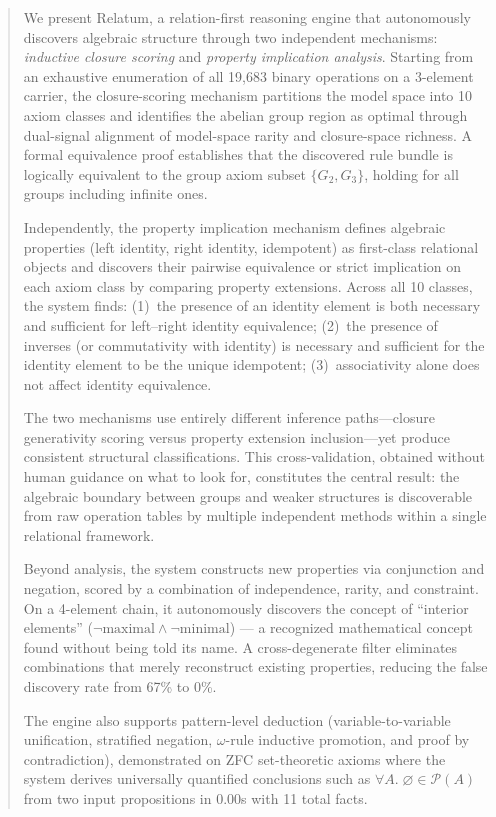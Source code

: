 \begin{abstract}

We present Relatum, a relation-first reasoning engine that autonomously discovers algebraic structure through two independent mechanisms: \emph{inductive closure scoring} and \emph{property implication analysis}. Starting from an exhaustive enumeration of all 19{,}683 binary operations on a 3-element carrier, the closure-scoring mechanism partitions the model space into 10 axiom classes and identifies the abelian group region as optimal through dual-signal alignment of model-space rarity and closure-space richness. A formal equivalence proof establishes that the discovered rule bundle is logically equivalent to the group axiom subset $\{G_2, G_3\}$, holding for all groups including infinite ones.

Independently, the property implication mechanism defines algebraic properties (left identity, right identity, idempotent) as first-class relational objects and discovers their pairwise equivalence or strict implication on each axiom class by comparing property extensions. Across all 10 classes, the system finds: (1)~the presence of an identity element is both necessary and sufficient for left--right identity equivalence; (2)~the presence of inverses (or commutativity with identity) is necessary and sufficient for the identity element to be the unique idempotent; (3)~associativity alone does not affect identity equivalence.

The two mechanisms use entirely different inference paths---closure generativity scoring versus property extension inclusion---yet produce consistent structural classifications. This cross-validation, obtained without human guidance on what to look for, constitutes the central result: the algebraic boundary between groups and weaker structures is discoverable from raw operation tables by multiple independent methods within a single relational framework.

Beyond analysis, the system constructs new properties via conjunction and negation, scored by a combination of independence, rarity, and constraint. On a 4-element chain, it autonomously discovers the concept of ``interior elements'' ($\lnot\text{maximal} \wedge \lnot\text{minimal}$) --- a recognized mathematical concept found without being told its name. A cross-degenerate filter eliminates combinations that merely reconstruct existing properties, reducing the false discovery rate from 67\% to 0\%.

The engine also supports pattern-level deduction (variable-to-variable unification, stratified negation, $\omega$-rule inductive promotion, and proof by contradiction), demonstrated on ZFC set-theoretic axioms where the system derives universally quantified conclusions such as $\forall A.\;\varnothing \in \mathcal{P}(A)$ from two input propositions in 0.00s with 11 total facts.

\end{abstract}

